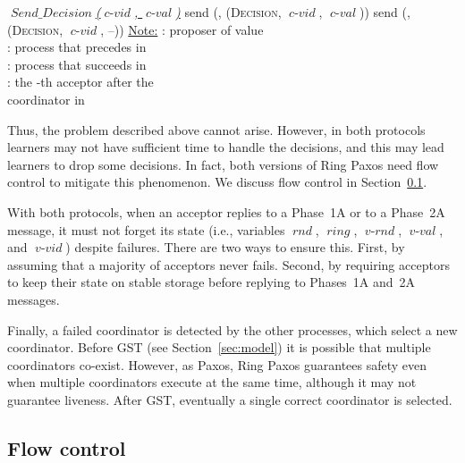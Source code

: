 \documentclass[final,3p,times,twocolumn,authoryear]{elsarticle}
\newcommand{\mv}[1]{\ensuremath{\operatorname{\mathit{#1}}}}
\begin{document}
\begin{algorithm}
\begin{distribalgo}[1]
\vspace{1.5mm}
\STATE \emph{\underline{\mv{Send\_Decision}(\mv{c-vid}, \mv{c-val})}}
		\STATE send (, (\textsc{Decision}, \mv{c-vid}, \mv{c-val}))
\ENDINDENT
{}
		\STATE send (, (\textsc{Decision}, \mv{c-vid}, --))
\ENDINDENT
\vspace{5mm}
\underline{Note:} \hspace{2mm}: proposer of value \\
\hspace{10mm}: process that precedes  in \\
\hspace{10mm}: process that succeeds  in \\
\hspace{10mm}: the -th acceptor after the\\
\hspace{10mm}coordinator in 
\label{alg:rpaxos2}
\end{distribalgo}


\end{algorithm}
 
Thus, the problem described above cannot arise. 
However, in both protocols learners may not have sufficient time to handle the decisions, and this may lead learners to drop some decisions. In fact, both versions of Ring Paxos need flow control  to mitigate this phenomenon. 
We discuss flow control in Section~\ref{sec:flowcontrol}.

With both protocols, when an acceptor replies to a Phase~1A or to a Phase~2A message, it must not forget its state (i.e., variables \mv{rnd}, \mv{ring}, \mv{v-rnd}, \mv{v-val}, and \mv{v-vid}) despite failures. There are two ways to ensure this. First, by assuming that a majority of acceptors never fails. Second, by requiring acceptors to keep their state on stable storage before replying to Phases~1A and~2A messages. 

Finally, a failed coordinator is detected by the other processes, which select a new coordinator. Before GST (see Section~\ref{sec:model}) it is possible that multiple coordinators co-exist. However, as Paxos, Ring Paxos guarantees safety even when multiple coordinators execute at the same time, although it may not guarantee liveness. After GST, eventually a single correct coordinator is selected.

\subsection{Flow control}
\label{sec:flowcontrol}
\end{document}
